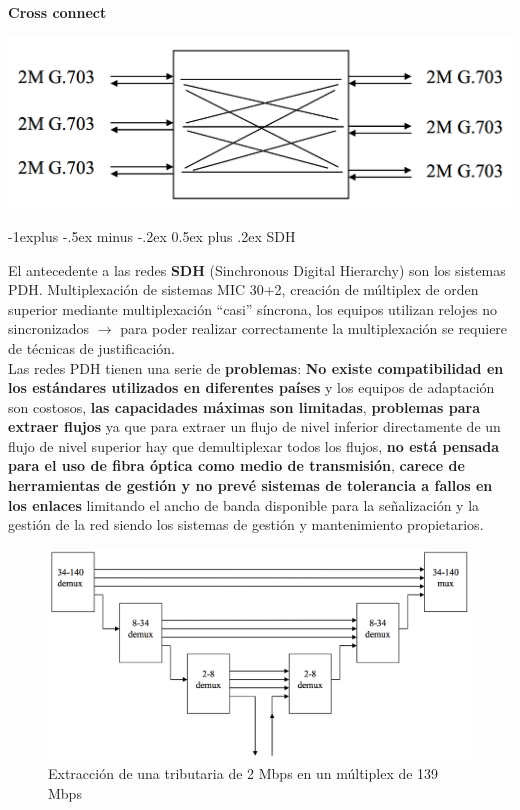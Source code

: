 \documentclass[10pt,portrait, twocolumn]{article}
\makeatletter
\renewcommand{\subsection}{\@startsection{subsection}{2}{0mm}%
                                {-1explus -.5ex minus -.2ex}%
                                {0.5ex plus .2ex}%
                                {\normalfont\normalsize\bfseries}}
\makeatother
\begin{document}
\textbf{Cross connect}

	\begin{center}
			\includegraphics[scale=0.2]{images/Cross}
		\end{center}

\hrulefill

\subsection{SDH}

El antecedente a las redes \textbf{SDH} (Sinchronous Digital Hierarchy) son los sistemas PDH. Multiplexación de sistemas MIC 30+2, creación de múltiplex de orden superior mediante multiplexación ``casi'' síncrona, los equipos utilizan relojes no sincronizados $\rightarrow$ para poder realizar correctamente la multiplexación se requiere de técnicas de justificación.\\

Las redes PDH tienen una serie de \textbf{problemas}: \textbf{No existe compatibilidad en los estándares utilizados en diferentes países} y los equipos de adaptación son costosos, \textbf{las capacidades máximas son limitadas}, \textbf{problemas para extraer flujos} ya que para extraer un flujo de nivel inferior directamente de un flujo de nivel superior hay que demultiplexar todos los flujos, \textbf{no está pensada para el uso de fibra óptica como medio de transmisión}, \textbf{carece de herramientas de gestión y no prevé sistemas de tolerancia a fallos en los enlaces} limitando el ancho de banda disponible para la señalización y la gestión de la red siendo los sistemas de gestión y mantenimiento propietarios.


	\begin{figure}[!ht]
 		\centering
  		 \includegraphics[scale = 0.3]{images/Extraccion}
		\caption{Extracción de una tributaria de 2 Mbps en un múltiplex de 139 Mbps}
	\end{figure}	
\end{document}
